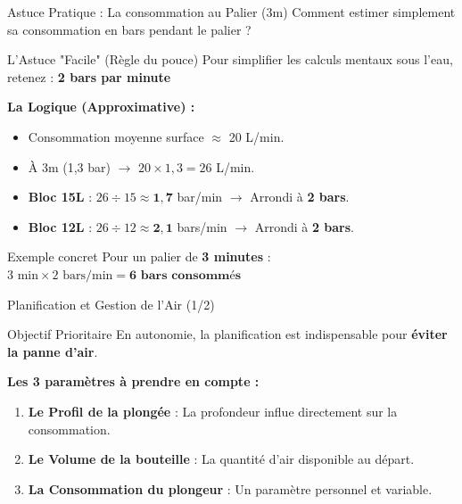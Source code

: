 \begin{frame}{Astuce Pratique : La consommation au Palier (3m)}
    Comment estimer simplement sa consommation en bars pendant le palier ?
    
    \begin{block}{L'Astuce "Facile" (Règle du pouce)}
        Pour simplifier les calculs mentaux sous l'eau, retenez :
        \centering\Large\textbf{\textcolor{ffessmred}{2 bars par minute}}
    \end{block}

    \textbf{La Logique (Approximative) :}
    \begin{itemize}
        \item Consommation moyenne surface $\approx$ 20 L/min.
        \item À 3m (1,3 bar) $\rightarrow$ $20 \times 1,3 = 26$ L/min.
        \item \textbf{Bloc 15L} : $26 \div 15 \approx \mathbf{1,7}$ bar/min $\rightarrow$ Arrondi à \textbf{2 bars}.
        \item \textbf{Bloc 12L} : $26 \div 12 \approx \mathbf{2,1}$ bars/min $\rightarrow$ Arrondi à \textbf{2 bars}.
    \end{itemize}

    \begin{exampleblock}{Exemple concret}
        Pour un palier de \textbf{3 minutes} :
        $ 3 \text{ min} \times 2 \text{ bars/min} = \mathbf{6 \text{ bars consommés}} $
    \end{exampleblock}
\end{frame}

\begin{frame}{Planification et Gestion de l'Air (1/2)}

    \begin{alertblock}{Objectif Prioritaire}
        En autonomie, la planification est indispensable pour \textbf{éviter la panne d'air}.
    \end{alertblock}

    \vspace{0.4cm}

    \textbf{Les 3 paramètres à prendre en compte :}
    \begin{enumerate}
        \item \textbf{Le Profil de la plongée} : La profondeur influe directement sur la consommation.
        \item \textbf{Le Volume de la bouteille} : La quantité d'air disponible au départ.
        \item \textbf{La Consommation du plongeur} : Un paramètre personnel et variable.
    \end{enumerate}

    \vspace{0.3cm}
\end{frame}

